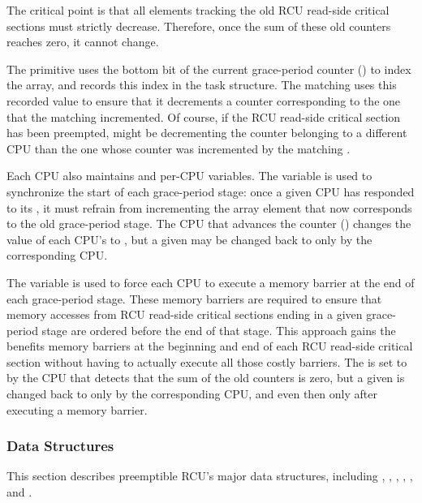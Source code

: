 The critical point is that all  elements
tracking the old RCU read-side critical sections must strictly decrease.
Therefore, once the sum of these old counters reaches zero,
it cannot change.

The  primitive uses the bottom
bit of the current grace-period counter
() to index the
 array,
and records this index in the task structure.
The matching  uses this recorded
value to ensure that it decrements a counter corresponding to
the one that the matching  incremented.
Of course, if the RCU read-side critical section has been preempted,
 might be decrementing the counter
belonging to a different CPU than the one whose counter was incremented
by the matching .

Each CPU also maintains  and
 per-CPU variables.
The  variable is used to synchronize the
start of each grace-period stage: once a given CPU has responded
to its , it must refrain from incrementing
the  array element that now corresponds to
the old grace-period stage.
The CPU that advances the counter ()
changes the value of each CPU's  to
, but a given 
may be changed back to  only by
the corresponding CPU.

The  variable is used to force each CPU to
execute a memory barrier at the end of each grace-period stage.
These memory barriers are required to ensure that memory accesses from
RCU read-side critical sections ending in a given grace-period stage
are ordered before the end of that stage.
This approach gains the benefits memory barriers at the
beginning and end of each RCU read-side critical section without
having to actually execute all those costly barriers.
The  is set to  by
the CPU that detects that the sum of the old counters is zero,
but a given  is changed back to
 only by the corresponding CPU, and even
then only after executing a memory barrier.

\subsubsection{Data Structures}
\label{app:rcuimpl:Data Structures}

This section describes preemptible RCU's major data structures, including
, , ,
, , and
.

